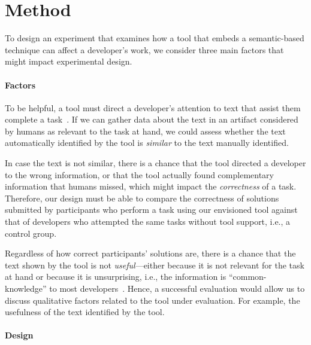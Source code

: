 


\section{Method}
\label{cp6:method}


To design an experiment
that examines how a tool that embeds a semantic-based technique can affect a developer's work,
we consider three main factors that might impact experimental design.




\paragraph{\textbf{Factors}}



To be helpful, a tool must direct a developer's attention to text that assist them complete a task~\cite{Robillard2015}. If we can gather data about the text in an artifact considered by humans as relevant to the task at hand, we could assess whether the text automatically identified by the tool is \textit{similar} to the text manually identified. 


In case the text is not similar,
there is a chance that the tool directed a developer to the wrong information, or that 
the tool actually found complementary information that humans missed, which might impact the \textit{correctness} of a task. Therefore, our design must be able to compare the correctness of solutions submitted by participants who perform a task using our envisioned tool against that of developers who attempted the same tasks without tool support, i.e., a control group.


Regardless of how correct participants' solutions are, there is a chance that the text shown by the tool is not \textit{useful}---either because it is not relevant for the task at hand or because it is unsurprising, i.e., the information is ``common-knowledge'' to most developers~\cite{cwalina2008, Robillard2015}. Hence, a successful evaluation would allow us to discuss qualitative factors 
related to the tool under evaluation. For example, the usefulness of the text identified by the tool. 




\paragraph{\textbf{Design}}




